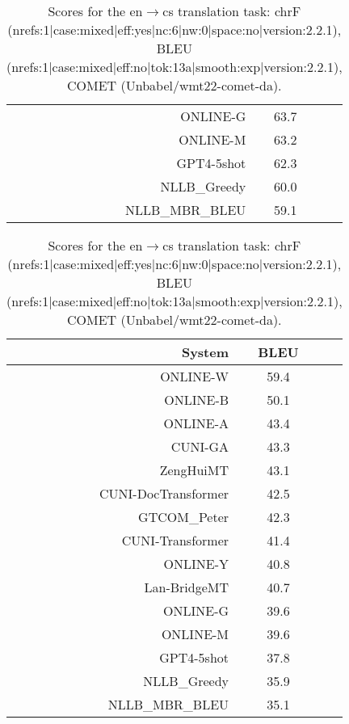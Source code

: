 \documentclass[11pt]{article}
\begin{document}
\begin{table}
\begin{subtable}[t]{0.33\textwidth}
\begin{tabular}{rcc}
\rowcolor{ashgrey} ONLINE-G   & 63.7 \\ 
\rowcolor{ashgrey} ONLINE-M   & 63.2 \\ 
\rowcolor{ashgrey} GPT4-5shot   & 62.3 \\ 
\rowcolor{ashgrey} NLLB\_Greedy   & 60.0 \\ 
\rowcolor{ashgrey} NLLB\_MBR\_BLEU   & 59.1 \\ 
\bottomrule 
\end{tabular} 
\end{subtable} 
\begin{subtable}[t]{0.33\textwidth}
\begin{tabular}{rcc}
\toprule 
System  & BLEU \\ 
\midrule 
\rowcolor{ashgrey} ONLINE-W   & 59.4 \\ 
\rowcolor{ashgrey} ONLINE-B   & 50.1 \\ 
\rowcolor{ashgrey} ONLINE-A   & 43.4 \\ 
CUNI-GA  & 43.3 \\ 
\rowcolor{ashgrey} ZengHuiMT   & 43.1 \\ 
CUNI-DocTransformer  & 42.5 \\ 
\rowcolor{ashgrey} GTCOM\_Peter   & 42.3 \\ 
CUNI-Transformer & 41.4 \\ 
\rowcolor{ashgrey} ONLINE-Y   & 40.8 \\ 
\rowcolor{ashgrey} Lan-BridgeMT   & 40.7 \\ 
\rowcolor{ashgrey} ONLINE-G   & 39.6 \\ 
\rowcolor{ashgrey} ONLINE-M   & 39.6 \\ 
\rowcolor{ashgrey} GPT4-5shot   & 37.8 \\ 
\rowcolor{ashgrey} NLLB\_Greedy   & 35.9 \\ 
\rowcolor{ashgrey} NLLB\_MBR\_BLEU   & 35.1 \\ 
\bottomrule 
\end{tabular} 
\end{subtable} 

\caption{Scores for the en$\rightarrow$cs translation task: chrF (nrefs:1|case:mixed|eff:yes|nc:6|nw:0|space:no|version:2.2.1), BLEU (nrefs:1|case:mixed|eff:no|tok:13a|smooth:exp|version:2.2.1), COMET (Unbabel/wmt22-comet-da).} 
\end{table} 
\end{document}
